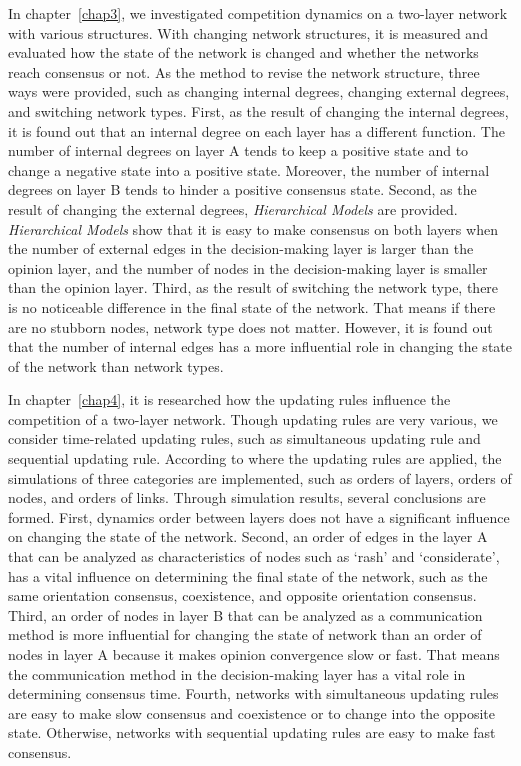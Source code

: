 In chapter~\ref{chap3}, we investigated competition dynamics on a two-layer network with various structures. With changing network structures, it is measured and evaluated how the state of the network is changed and whether the networks reach consensus or not. As the method to revise the network structure, three ways were provided, such as changing internal degrees, changing external degrees, and switching network types. First, as the result of changing the internal degrees, it is found out that an internal degree on each layer has a different function. The number of internal degrees on layer A tends to keep a positive state and to change a negative state into a positive state. Moreover, the number of internal degrees on layer B tends to hinder a positive consensus state. Second, as the result of changing the external degrees, \textit{Hierarchical Models} are provided. \textit{Hierarchical Models} show that it is easy to make consensus on both layers when the number of external edges in the decision-making layer is larger than the opinion layer, and the number of nodes in the decision-making layer is smaller than the opinion layer. Third, as the result of switching the network type, there is no noticeable difference in the final state of the network. That means if there are no stubborn nodes, network type does not matter. However, it is found out that the number of internal edges has a more influential role in changing the state of the network than network types.

In chapter~\ref{chap4}, it is researched how the updating rules influence the competition of a two-layer network. Though updating rules are very various, we consider time-related updating rules, such as simultaneous updating rule and sequential updating rule. According to where the updating rules are applied, the simulations of three categories are implemented, such as orders of layers, orders of nodes, and orders of links. Through simulation results, several conclusions are formed. First, dynamics order between layers does not have a significant influence on changing the state of the network. Second, an order of edges in the layer A that can be analyzed as characteristics of nodes such as `rash' and `considerate', has a vital influence on determining the final state of the network, such as the same orientation consensus, coexistence, and opposite orientation consensus. Third, an order of nodes in layer B that can be analyzed as a communication method is more influential for changing the state of network than an order of nodes in layer A because it makes opinion convergence slow or fast. That means the communication method in the decision-making layer has a vital role in determining consensus time. Fourth, networks with simultaneous updating rules are easy to make slow consensus and coexistence or to change into the opposite state. Otherwise, networks with sequential updating rules are easy to make fast consensus.

